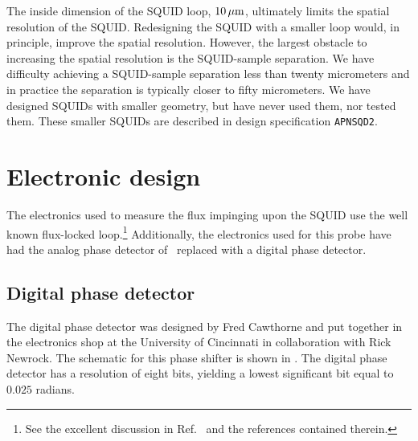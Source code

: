 The inside dimension of the SQUID loop, $10\,\mu\mathrm{m}$,
ultimately limits the spatial resolution of the SQUID. Redesigning
the SQUID with a smaller loop would, in principle, improve the
spatial resolution.
However, the largest obstacle to increasing the spatial 
resolution is the SQUID-sample separation. 
We have difficulty achieving  a
SQUID-sample separation less than twenty micrometers and in practice
the separation is typically closer to fifty micrometers. We 
have designed SQUIDs with smaller geometry, but have never used them, 
nor tested them. These smaller SQUIDs are described in design specification 
\texttt{APNSQD2}.

\section{Electronic design}

The electronics used to measure the flux impinging upon the SQUID use
the well known flux-locked loop.\footnote{See the excellent discussion 
in Ref.~\cite{black_phdthesis} and the references contained therein.}
Additionally, the electronics used for this probe have had the analog
phase detector of \
replaced with a digital phase detector.

\subsection{Digital phase detector}
\label{sec:dig_phase_shifter}

The
digital phase detector was designed by Fred Cawthorne and put together
in the electronics shop at the University of Cincinnati in
collaboration with Rick Newrock. The schematic for this phase
shifter is shown in . The
digital phase detector has a resolution of eight bits, yielding
a lowest significant bit equal to $0.025$ radians. 

